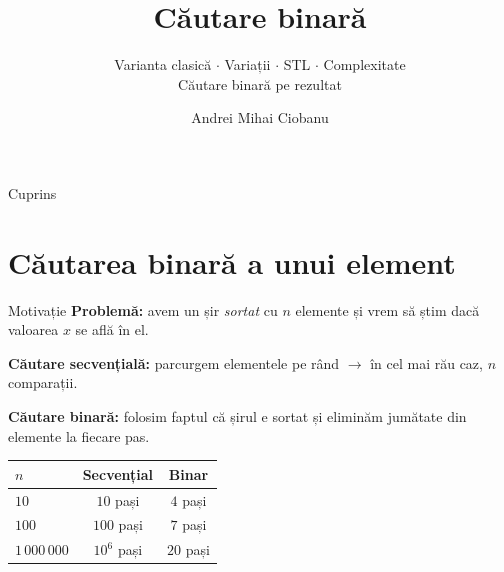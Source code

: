 \documentclass{beamer}
\title{Căutare binară}
\subtitle{Varianta clasică $\cdot$ Variații $\cdot$ STL $\cdot$ Complexitate \\ Căutare binară pe rezultat}
\author{Andrei Mihai Ciobanu}
\institute{Algolymp Summer School}
\date{}
\begin{document}
\begin{frame}[shrink]
  \titlepage
\end{frame}

\begin{frame}{Cuprins}
  \tableofcontents
\end{frame}

\section{Căutarea binară a unui element}

\begin{frame}{Motivație}
  \textbf{Problemă:} avem un șir \emph{sortat} cu $n$ elemente și vrem să știm dacă valoarea $x$ se află în el.

  \textbf{Căutare secvențială:} parcurgem elementele pe rând $\rightarrow$ în cel mai rău caz, $n$ comparații.

  \textbf{Căutare binară:} folosim faptul că șirul e sortat și eliminăm jumătate din elemente la fiecare pas.

  \smallskip
  \begin{center}
  \begin{tabular}{lcc}
    \toprule
    $n$ & Secvențial & Binar \\
    \midrule
    $10$            & $10$ pași       & $4$ pași  \\
    $100$           & $100$ pași      & $7$ pași  \\
    $1\,000\,000$   & $10^6$ pași     & $20$ pași \\
    \bottomrule
  \end{tabular}
  \end{center}
\end{frame}
\end{document}
